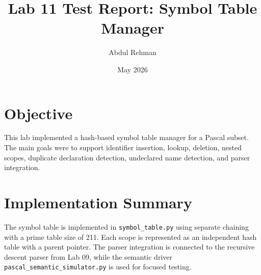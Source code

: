 \documentclass[11pt,a4paper]{article}
\title{Lab 11 Test Report: Symbol Table Manager}
\author{Abdul Rehman}
\date{May 2026}
\begin{document}
\maketitle

\section*{Objective}
This lab implemented a hash-based symbol table manager for a Pascal subset. The main goals were to support identifier insertion, lookup, deletion, nested scopes, duplicate declaration detection, undeclared name detection, and parser integration.

\section*{Implementation Summary}
The symbol table is implemented in \texttt{symbol\_table.py} using separate chaining with a prime table size of 211. Each scope is represented as an independent hash table with a parent pointer. The parser integration is connected to the recursive descent parser from Lab 09, while the semantic driver \texttt{pascal\_semantic\_simulator.py} is used for focused testing.
\end{document}
